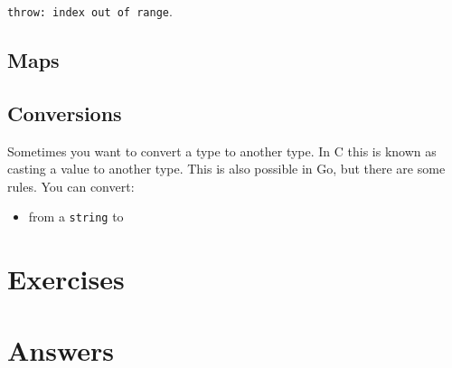 \noindent\lstinline{throw: index out of range}.

\subsection{Maps}
\label{sec:maps}

\subsection{Conversions}
Sometimes you want to convert a type to another type. In C this is known
as casting a value to another type. This is also possible in Go, but
there are some rules.
You can convert:
\begin{itemize}
\item{from a \lstinline{string} to}
\end{itemize}



\section{Exercises}




\cleardoublepage
\section{Answers}
\shipoutAnswer
